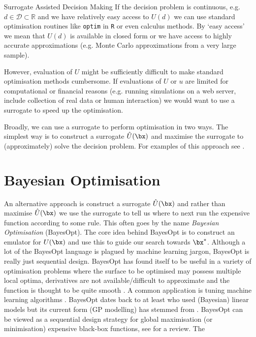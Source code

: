 \begin{chapter}{Surrogate Assisted Decision Making \label{Chap:optimisation}}
If the decision problem is continuous, e.g. $d \in \mathcal{D} \subset \mathbb{R}$ and we have relatively easy access to $U(d)$ we can use standard optimisation routines like \verb|optim| in \verb|R| or even calculus methods.  By `easy access' we mean that $U(d)$ is available in closed form or we have access to highly accurate approximations (e.g. Monte Carlo approximations from a very large sample).

However, evaluation of $U$ might be sufficiently difficult to make standard optimisation methods cumbersome. If evaluations of $U$ or $u$ are limited for computational or financial reasons (e.g. running simulations on a web server, include collection of real data or human interaction) we would want to use a surrogate to speed up the optimisation.

Broadly, we can use a surrogate to perform optimisation in two ways. The simplest way is to construct a surrogate $\hat{U}(\bx)$ and maximise the surrogate to (approximately) solve the decision problem. For examples of this approach see \citep{Wilson2018, Overstall2017}.

\section{Bayesian Optimisation}

An alternative approach is construct a surrogate $\hat{U}(\bx)$ and rather than maximise $\hat{U}(\bx)$ we use the surrogate to tell us where to next run the expensive function according to some rule. This often goes by the name \textit{Bayesian Optimisation} (BayesOpt). The core idea behind BayesOpt is to construct an emulator for $U(\bx)$ and use this to guide our search towards $\bx^{*}$. Although a lot of the BayesOpt language is plagued by machine learning jargon, BayesOpt is really just sequential design. BayesOpt has found itself to be useful in a variety of optimisation problems where the surface to be optimised may possess multiple local optima, derivatives are not available/difficult to approximate and the function is thought to be quite smooth \citep{Frazier2018}. A common application is tuning machine learning algorithms \citep{Joy2016, Snoek2012}. BayesOpt dates back to at least \citet{Mockus1975} who used (Bayesian) linear models but its current form (GP modelling) has stemmed from \citet{Jones1998}. BayesOpt can be viewed as a sequential design strategy for global maximisation (or minimisation) expensive black-box functions, see \citet{Frazier2018} for a review. The


\end{chapter}
